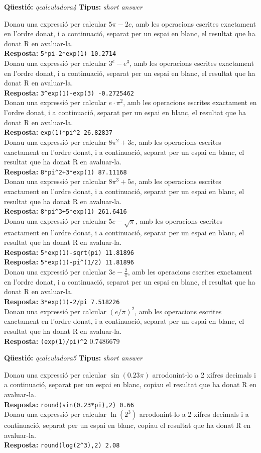 \documentclass[10pt]{article}
\newcommand{\answer}{\textbf{Resposta: }}
\newcommand{\newquestion}[2]{\noindent\textbf{Qüestió: }\emph{#1} \textbf{Tipus: }\emph{#2}\medskip}
\begin{document}
\newquestion{qcalculadora4}{short answer} 
\def\qcalculadora4#1{Donau una expressió per calcular $#1$,  amb les operacions escrites exactament en l'ordre donat,  i a continuació, separat per un espai en blanc, el resultat que ha donat R en avaluar-la.}

\qcalculadora4{5\pi-2e}\\
\answer{\verb?5*pi-2*exp(1) 10.2714?}\\

\qcalculadora4{3^e-e^3}\\
\answer{\verb?3^exp(1)-exp(3) -0.2725462?}\\

\qcalculadora4{e\cdot \pi^2}\\
\answer{\verb?exp(1)*pi^2 26.82837?}\\

\qcalculadora4{8\pi^2+3e}\\
\answer{\verb?8*pi^2+3*exp(1) 87.11168?}\\

\qcalculadora4{8\pi^3+5e}\\
\answer{\verb?8*pi^3+5*exp(1) 261.6416?}\\

\qcalculadora4{5e-\sqrt{\pi}}\\
\answer{\verb?5*exp(1)-sqrt(pi) 11.81896?}\\
\answer{\verb?5*exp(1)-pi^(1/2) 11.81896?}\\

\qcalculadora4{3e-\frac{2}{\pi}}\\
\answer{\verb?3*exp(1)-2/pi 7.518226?}\\

\qcalculadora4{(e/\pi)^2}\\
\answer{\verb?(exp(1)/pi)^2? 0.7486679}\\

\newpage

\newquestion{qcalculadora5}{short answer} 
\def\qcalculadora5#1#2{Donau una expressió per calcular $#1$ arrodonint-lo  a #2 xifres decimals i a  continuació, separat per un espai en blanc, copiau el resultat que ha donat R en avaluar-la.}

\qcalculadora5{\sin(0.23\pi)}{2}\\
\answer{\verb?round(sin(0.23*pi),2) 0.66?}\\

\qcalculadora5{\ln(2^3)}{2}\\
\answer{\verb?round(log(2^3),2) 2.08?}\\
\end{document}
